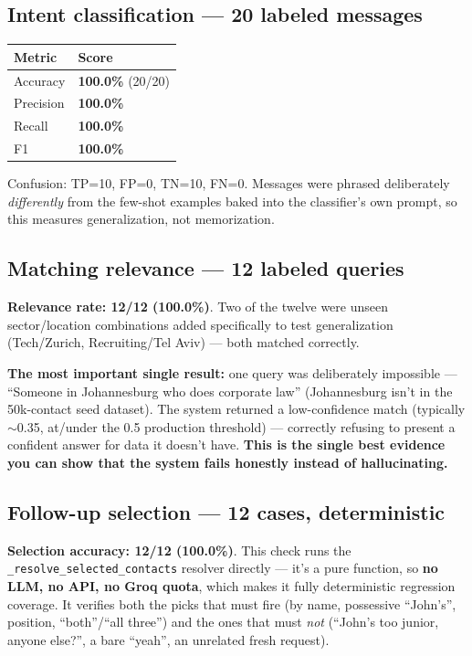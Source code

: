 \documentclass[11pt, a4paper]{article}
\newcommand{\good}[1]{\textcolor{good}{\textbf{#1}}}
\begin{document}
\subsection{Intent classification --- 20 labeled messages}
\begin{longtable}{@{}p{5cm}p{2cm}@{}}
\toprule
Metric & Score \\
\midrule
\endhead
Accuracy & \good{100.0\%} (20/20) \\
Precision & \good{100.0\%} \\
Recall & \good{100.0\%} \\
F1 & \good{100.0\%} \\
\bottomrule
\end{longtable}
Confusion: TP=10, FP=0, TN=10, FN=0. Messages were phrased deliberately \emph{differently} from the few-shot examples baked into the classifier's own prompt, so this measures generalization, not memorization.

\subsection{Matching relevance --- 12 labeled queries}
\textbf{Relevance rate: \good{12/12 (100.0\%)}}. Two of the twelve were unseen sector/location combinations added specifically to test generalization (Tech/Zurich, Recruiting/Tel Aviv) --- both matched correctly.

\textbf{The most important single result:} one query was deliberately impossible --- ``Someone in Johannesburg who does corporate law'' (Johannesburg isn't in the 50k-contact seed dataset). The system returned a low-confidence match (typically $\sim$0.35, at/under the 0.5 production threshold) --- correctly refusing to present a confident answer for data it doesn't have. \textbf{This is the single best evidence you can show that the system fails honestly instead of hallucinating.}

\subsection{Follow-up selection --- 12 cases, deterministic}
\textbf{Selection accuracy: \good{12/12 (100.0\%)}}. This check runs the \texttt{\_resolve\_selected\_contacts} resolver directly --- it's a pure function, so \textbf{no LLM, no API, no Groq quota}, which makes it fully deterministic regression coverage. It verifies both the picks that must fire (by name, possessive ``John's'', position, ``both''/``all three'') and the ones that must \emph{not} (``John's too junior, anyone else?'', a bare ``yeah'', an unrelated fresh request).
\end{document}
